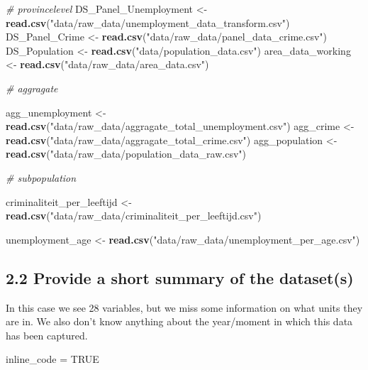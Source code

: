 \documentclass[
]{article}
\newenvironment{Shaded}{\begin{snugshade}}{\end{snugshade}}
\newcommand{\CommentTok}[1]{\textcolor[rgb]{0.56,0.35,0.01}{\textit{#1}}}
\newcommand{\ConstantTok}[1]{\textcolor[rgb]{0.56,0.35,0.01}{#1}}
\newcommand{\FunctionTok}[1]{\textcolor[rgb]{0.13,0.29,0.53}{\textbf{#1}}}
\newcommand{\NormalTok}[1]{#1}
\newcommand{\OtherTok}[1]{\textcolor[rgb]{0.56,0.35,0.01}{#1}}
\newcommand{\StringTok}[1]{\textcolor[rgb]{0.31,0.60,0.02}{#1}}
\begin{document}
\begin{Shaded}
\begin{Highlighting}[]
\CommentTok{\# provincelevel}
\NormalTok{DS\_Panel\_Unemployment }\OtherTok{\textless{}{-}} \FunctionTok{read.csv}\NormalTok{(}\StringTok{"data/raw\_data/unemployment\_data\_transform.csv"}\NormalTok{)}
\NormalTok{DS\_Panel\_Crime }\OtherTok{\textless{}{-}} \FunctionTok{read.csv}\NormalTok{(}\StringTok{"data/raw\_data/panel\_data\_crime.csv"}\NormalTok{)}
\NormalTok{DS\_Population }\OtherTok{\textless{}{-}} \FunctionTok{read.csv}\NormalTok{(}\StringTok{"data/population\_data.csv"}\NormalTok{)}
\NormalTok{area\_data\_working }\OtherTok{\textless{}{-}} \FunctionTok{read.csv}\NormalTok{(}\StringTok{"data/raw\_data/area\_data.csv"}\NormalTok{)}

\CommentTok{\# aggragate}

\NormalTok{agg\_unemployment }\OtherTok{\textless{}{-}} \FunctionTok{read.csv}\NormalTok{(}\StringTok{"data/raw\_data/aggragate\_total\_unemployment.csv"}\NormalTok{)}
\NormalTok{agg\_crime }\OtherTok{\textless{}{-}} \FunctionTok{read.csv}\NormalTok{(}\StringTok{"data/raw\_data/aggragate\_total\_crime.csv"}\NormalTok{)}
\NormalTok{agg\_population }\OtherTok{\textless{}{-}} \FunctionTok{read.csv}\NormalTok{(}\StringTok{"data/raw\_data/population\_data\_raw.csv"}\NormalTok{)}

\CommentTok{\# subpopulation}

\NormalTok{criminaliteit\_per\_leeftijd }\OtherTok{\textless{}{-}} \FunctionTok{read.csv}\NormalTok{(}\StringTok{"data/raw\_data/criminaliteit\_per\_leeftijd.csv"}\NormalTok{) }

\NormalTok{unemployment\_age }\OtherTok{\textless{}{-}} \FunctionTok{read.csv}\NormalTok{(}\StringTok{"data/raw\_data/unemployment\_per\_age.csv"}\NormalTok{) }
\end{Highlighting}
\end{Shaded}

\subsection{2.2 Provide a short summary of the
dataset(s)}\label{provide-a-short-summary-of-the-datasets}

In this case we see 28 variables, but we miss some information on what
units they are in. We also don't know anything about the year/moment in
which this data has been captured.

\begin{Shaded}
\begin{Highlighting}[]
\NormalTok{inline\_code }\OtherTok{=} \ConstantTok{TRUE}
\end{Highlighting}
\end{Shaded}
\end{document}
